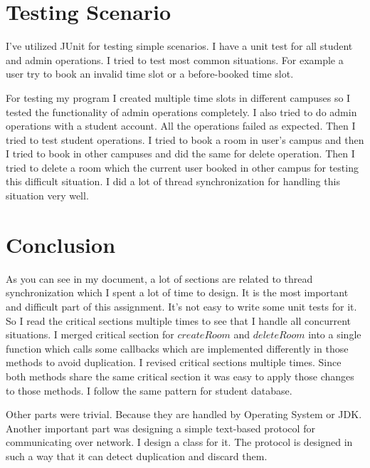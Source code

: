 \documentclass[12pt]{article}
\begin{document}
\section{Testing Scenario}
I've utilized JUnit for testing simple scenarios. I have a unit test for all student and admin operations. I tried to test most common situations. For example a user try to book an invalid time slot or a before-booked time slot.
\par For testing my program I created multiple time slots in different campuses so I tested the functionality of admin operations completely. I also tried to do admin operations with a student account. All the operations failed as expected. Then I tried to test student operations. I tried to book a room in user's campus and then I tried to book in other campuses and did the same for delete operation. Then I tried to delete a room which the current user booked in other campus for testing this difficult situation. I did a lot of thread synchronization for handling this situation very well.
\section{Conclusion}
As you can see in my document, a lot of sections are related to  thread synchronization which I spent a lot of time to design. It is the most important and difficult part of this assignment. It's not easy to write some unit tests for it. So I read the critical sections multiple times to see that I handle all concurrent situations. I merged critical section for $createRoom$ and $deleteRoom$ into a single function which calls some callbacks which are implemented differently in those methods to avoid duplication. I revised critical sections multiple times. Since both methods share the same critical section it was easy to apply those changes to those methods. I follow the same pattern for student database.
\par Other parts were trivial. Because they are handled by Operating System or JDK. Another important part was designing a simple text-based protocol for communicating over network. I design a class for it. The protocol is designed in such a way that it can detect duplication and discard them.




\end{document}
